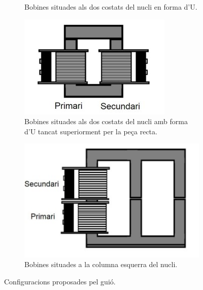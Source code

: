 \documentclass[a4paper,10.5pt]{report}
\begin{document}
\begin{figure}[h]
\begin{subfigure}[b]{0.22\textwidth}
		\caption{Bobines situades als dos costats del nucli en forma d'U.}
		\label{fig4:2b}
	\end{subfigure}
	\hspace{0.4cm}
	\begin{subfigure}[b]{0.22\textwidth}
		\centering
		\includegraphics[width=\textwidth]{42c.jpg}
		\caption{Bobines situades als dos costats del nucli amb forma d'U tancat superiorment per la peça recta.}
		\label{fig4:2c}
	\end{subfigure}
	\hspace{0.4cm}
	\begin{subfigure}[b]{0.22\textwidth}
		\centering
		\includegraphics[width=\textwidth]{42d.jpg}
		\caption{Bobines situades a la columna esquerra del nucli.}
		\label{fig4:2d}
	\end{subfigure}
	\caption{Configuracions proposades pel guió.}
	\label{fig4:2}
\end{figure}
\end{document}

